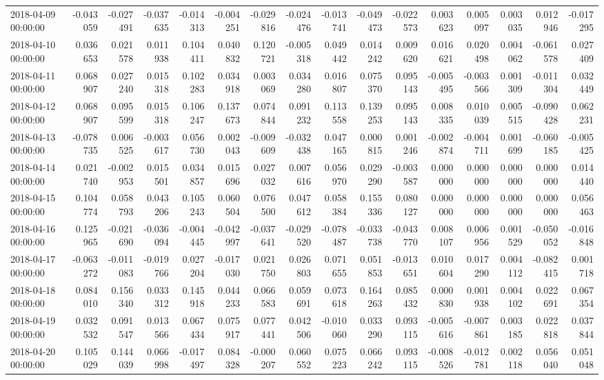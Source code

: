 \begin{tabular}{lrrrrrrrrrrrrrrr}
2018-04-09 00:00:00 & -0.043059 & -0.027491 & -0.037635 & -0.014313 & -0.004251 & -0.029816 & -0.024476 & -0.013741 & -0.049473 & -0.022573 & 0.003623 & 0.005097 & 0.003035 & 0.012946 & -0.017295 \\
2018-04-10 00:00:00 & 0.036653 & 0.021578 & 0.011938 & 0.104411 & 0.040832 & 0.120721 & -0.005318 & 0.049442 & 0.014242 & 0.009620 & 0.016621 & 0.020498 & 0.004062 & -0.061578 & 0.027409 \\
2018-04-11 00:00:00 & 0.068907 & 0.027240 & 0.015318 & 0.102283 & 0.034918 & 0.003069 & 0.034280 & 0.016807 & 0.075370 & 0.095143 & -0.005495 & -0.003566 & 0.001309 & -0.011304 & 0.032449 \\
2018-04-12 00:00:00 & 0.068907 & 0.095599 & 0.015318 & 0.106247 & 0.137673 & 0.074844 & 0.091232 & 0.113558 & 0.139253 & 0.095143 & 0.008335 & 0.010039 & 0.005515 & -0.090428 & 0.062231 \\
2018-04-13 00:00:00 & -0.078735 & 0.006525 & -0.003617 & 0.056730 & 0.002043 & -0.009609 & -0.032438 & 0.047165 & 0.000815 & 0.001246 & -0.002874 & -0.004711 & 0.001699 & -0.060185 & -0.005425 \\
2018-04-14 00:00:00 & 0.021740 & -0.002953 & 0.015501 & 0.034857 & 0.015696 & 0.027032 & 0.007616 & 0.056970 & 0.029290 & -0.003587 & 0.000000 & 0.000000 & 0.000000 & 0.000000 & 0.014440 \\
2018-04-15 00:00:00 & 0.104774 & 0.058793 & 0.043206 & 0.105243 & 0.060504 & 0.076500 & 0.047612 & 0.058384 & 0.155336 & 0.080127 & 0.000000 & 0.000000 & 0.000000 & 0.000000 & 0.056463 \\
2018-04-16 00:00:00 & 0.125965 & -0.021690 & -0.036094 & -0.004445 & -0.042997 & -0.037641 & -0.029520 & -0.078487 & -0.033738 & -0.043770 & 0.008107 & 0.006956 & 0.001529 & -0.050052 & -0.016848 \\
2018-04-17 00:00:00 & -0.063272 & -0.011083 & -0.019766 & 0.027204 & -0.017030 & 0.021750 & 0.026803 & 0.071655 & 0.051853 & -0.013651 & 0.010604 & 0.017290 & 0.004112 & -0.082415 & 0.001718 \\
2018-04-18 00:00:00 & 0.084010 & 0.156340 & 0.033312 & 0.145918 & 0.044233 & 0.066583 & 0.059691 & 0.073618 & 0.164263 & 0.085432 & 0.000830 & 0.001938 & 0.004102 & 0.022691 & 0.067354 \\
2018-04-19 00:00:00 & 0.032532 & 0.091547 & 0.013566 & 0.067434 & 0.075917 & 0.077441 & 0.042506 & -0.010060 & 0.033290 & 0.093115 & -0.005616 & -0.007861 & 0.003185 & 0.022818 & 0.037844 \\
2018-04-20 00:00:00 & 0.105029 & 0.144039 & 0.066998 & -0.017497 & 0.084328 & -0.000207 & 0.060552 & 0.075223 & 0.066242 & 0.093115 & -0.008526 & -0.012781 & 0.002118 & 0.056040 & 0.051048 \\

\end{tabular}
